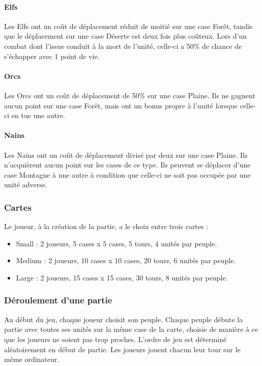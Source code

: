 \documentclass[a4paper]{article}
\begin{document}
\paragraph{Elfs} Les Elfs ont un coût de déplacement réduit de moitié sur une case Forêt, tandis que le déplacement sur une case Déserte est deux fois plus coûteux. Lors d'un combat dont l'issue conduit à la mort de l'unité, celle-ci a 50\% de chance de s'échapper avec 1 point de vie.
\paragraph{Orcs} Les Orcs ont un coût de déplacement de 50\% sur une case Plaine. Ils ne gagnent aucun point sur une case Forêt, mais ont un bonus propre à l'unité lorsque celle-ci en tue une autre.
\paragraph{Nains} Les Nains ont un coût de déplacement divisé par deux sur une case Plaine. Ils n'acquièrent aucun point sur les cases de ce type. Ils peuvent se déplacer d'une case Montagne à une autre à condition que celle-ci ne soit pas occupée par une unité adverse.

		\subsubsection{Cartes}
Le joueur, à la création de la partie, a le choix entre trois cartes :
\begin{itemize}
\item Small : 2 joueurs, 5 cases x 5 cases, 5 tours, 4 unités par peuple.
\item Medium : 2 joueurs, 10 cases x 10 cases, 20 tours, 6 unités par peuple.
\item Large : 2 joueurs, 15 cases x 15 cases, 30 tours, 8 unités par peuple.
\end{itemize}

		\subsubsection{Déroulement d'une partie}
Au début du jeu, chaque joueur choisit son peuple. Chaque peuple débute la partie avec toutes ses unités sur la même case de la carte, choisie de manière à ce que les joueurs ne soient pas trop proches. L’ordre de jeu est déterminé aléatoirement en début de partie. Les joueurs jouent chacun leur tour sur le même ordinateur.
\end{document}
